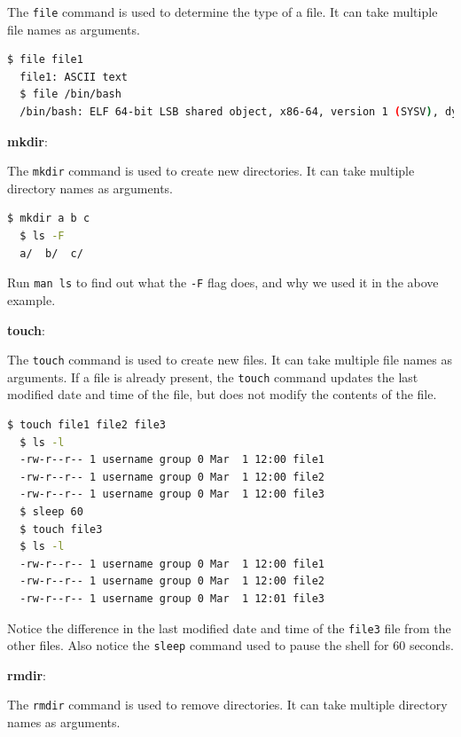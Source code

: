 The \texttt{file} command is used to determine the type of a file.
It can take multiple file names as arguments.

\begin{lstlisting}[language=bash]
  $ file file1
  file1: ASCII text
  $ file /bin/bash
  /bin/bash: ELF 64-bit LSB shared object, x86-64, version 1 (SYSV), dynamically linked, interpreter /lib64/ld-linux-x86-64.so.2, for GNU/Linux 3.2.0, BuildID[sha1]=1234567890abcdef, stripped
\end{lstlisting}


\textbf{mkdir}:

The \texttt{mkdir} command is used to create new directories.
It can take multiple directory names as arguments.

\begin{lstlisting}[language=bash]
  $ mkdir a b c
  $ ls -F
  a/  b/  c/
\end{lstlisting}

\begin{exercise}
  Run \texttt{man ls} to find out what the \texttt{-F} flag does, and why we used it in the above example.
\end{exercise}

\textbf{touch}:

The \texttt{touch} command is used to create new files.
It can take multiple file names as arguments.
If a file is already present, the \texttt{touch} command updates the last modified date and time of the file, but does not modify the contents of the file.

\begin{lstlisting}[language=bash]
  $ touch file1 file2 file3
  $ ls -l
  -rw-r--r-- 1 username group 0 Mar  1 12:00 file1
  -rw-r--r-- 1 username group 0 Mar  1 12:00 file2
  -rw-r--r-- 1 username group 0 Mar  1 12:00 file3
  $ sleep 60
  $ touch file3
  $ ls -l
  -rw-r--r-- 1 username group 0 Mar  1 12:00 file1
  -rw-r--r-- 1 username group 0 Mar  1 12:00 file2
  -rw-r--r-- 1 username group 0 Mar  1 12:01 file3
\end{lstlisting}

\begin{exercise}
  Notice the difference in the last modified date and time of the \texttt{file3} file from the other files.
  Also notice the \texttt{sleep} command used to pause the shell for 60 seconds.
\end{exercise}

\textbf{rmdir}:

The \texttt{rmdir} command is used to remove directories.
It can take multiple directory names as arguments.


